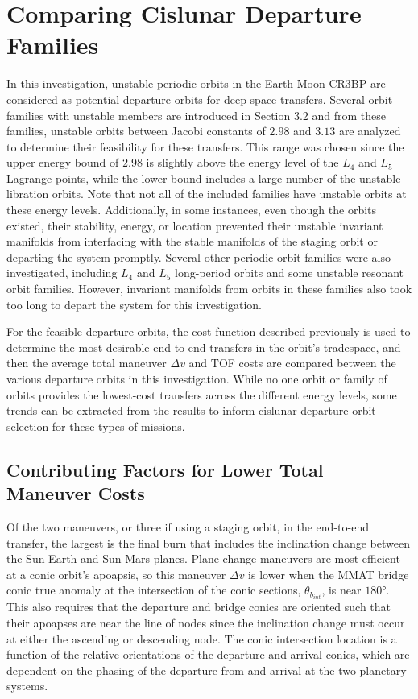 \section{Comparing Cislunar Departure Families}
In this investigation, unstable periodic orbits in the Earth-Moon CR3BP are considered as potential
departure orbits for deep-space transfers. Several orbit families with unstable members are
introduced in Section 3.2 and from these families, unstable orbits between Jacobi constants of
$2.98$ and $3.13$ are analyzed to determine their feasibility for these transfers. This range was
chosen since the upper energy bound of $2.98$ is slightly above the energy level of the $L_{4}$ and
$L_{5}$ Lagrange points, while the lower bound includes a large number of the unstable libration
orbits\cite{Zimovan:2017}. Note that not all of the included families have unstable orbits at these
energy levels. Additionally, in some instances, even though the orbits existed, their stability,
energy, or location prevented their unstable invariant manifolds from interfacing with the stable
manifolds of the staging orbit or departing the system promptly. Several other periodic orbit
families were also investigated, including $L_{4}$ and $L_{5}$ long-period orbits and some unstable
resonant orbit families. However, invariant manifolds from orbits in these families also took too
long to depart the system for this investigation.

For the feasible departure orbits, the cost function described previously is used to determine the
most desirable end-to-end transfers in the orbit's tradespace, and then the average total
maneuver $\Delta v$ and TOF costs are compared between the various departure orbits in this
investigation. While no one orbit or family of orbits provides the lowest-cost transfers across the
different energy levels, some trends can be extracted from the results to inform cislunar departure
orbit selection for these types of missions.

\subsection{Contributing Factors for Lower Total Maneuver Costs}
Of the two maneuvers, or three if using a staging orbit, in the end-to-end transfer, the largest is
the final burn that includes the inclination change between the Sun-Earth and Sun-Mars planes.
Plane change maneuvers are most efficient at a conic orbit's apoapsis, so this maneuver $\Delta v$
is lower when the MMAT bridge conic true anomaly at the intersection of the conic sections,
$\theta_{b_{int}}$, is near $\ang{180}$. This also requires that the departure and bridge conics
are oriented such that their apoapses are near the line of nodes since the inclination change must
occur at either the ascending or descending node. The conic intersection location is a function of
the relative orientations of the departure and arrival conics, which are dependent on the phasing
of the departure from and arrival at the two planetary systems. 

